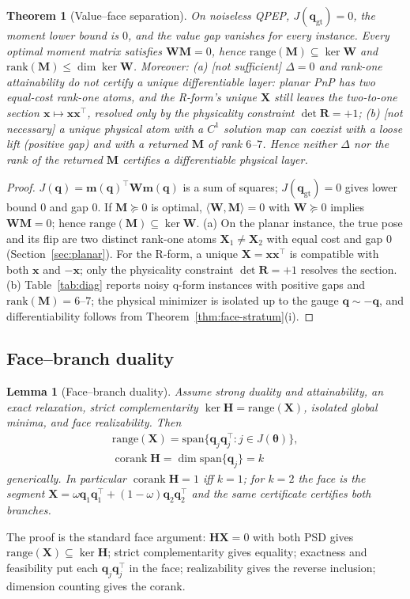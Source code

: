 \documentclass[conference]{IEEEtran}
\newtheorem{theorem}{Theorem}
\newtheorem{lemma}{Lemma}
\newcommand{\corank}{\operatorname{corank}}
\newcommand{\bx}{\bm{x}}
\newcommand{\bq}{\bm{q}}
\newcommand{\bth}{\bm{\theta}}
\newcommand{\bR}{\bm{R}}
\newcommand{\bH}{\bm{H}}
\newcommand{\bW}{\bm{W}}
\newcommand{\bX}{\bm{X}}
\newcommand{\bM}{\bm{M}}
\begin{document}
\begin{theorem}[Value--face separation]
\label{thm:value-face}
On noiseless QPEP, $J(\bq_{\mathrm{gt}})=0$, the moment lower bound is $0$, and the value gap vanishes for every instance. Every optimal moment matrix satisfies $\bW\bM=0$, hence $\mathrm{range}(\bM)\subseteq\ker\bW$ and $\mathrm{rank}(\bM)\le\dim\ker\bW$. Moreover:
(a) \emph{[not sufficient]} $\Delta=0$ and rank-one attainability do not certify a unique differentiable layer: planar PnP has two equal-cost rank-one atoms, and the R-form's unique $\bX$ still leaves the two-to-one section $\bx\mapsto\bx\bx^\top$, resolved only by the physicality constraint $\det\bR=+1$;
(b) \emph{[not necessary]} a unique physical atom with a $C^1$ solution map can coexist with a loose lift (positive gap) and with a returned $\bM$ of rank $6$--$7$.
Hence neither $\Delta$ nor the rank of the returned $\bM$ certifies a differentiable physical layer.
\end{theorem}
\begin{proof}
$J(\bq)=\bm{m}(\bq)^\top\bW\bm{m}(\bq)$ is a sum of squares; $J(\bq_{\mathrm{gt}})=0$ gives lower bound $0$ and gap $0$. If $\bM\succeq0$ is optimal, $\langle\bW,\bM\rangle=0$ with $\bW\succeq0$ implies $\bW\bM=0$; hence $\mathrm{range}(\bM)\subseteq\ker\bW$.
(a) On the planar instance, the true pose and its flip are two distinct rank-one atoms $\bX_1\ne\bX_2$ with equal cost and gap $0$ (Section~\ref{sec:planar}). For the R-form, a unique $\bX=\bx\bx^\top$ is compatible with both $\bx$ and $-\bx$; only the physicality constraint $\det\bR=+1$ resolves the section.
(b) Table~\ref{tab:diag} reports noisy q-form instances with positive gaps and $\mathrm{rank}(\bM)=6$--$7$; the physical minimizer is isolated up to the gauge $\bq\sim-\bq$, and differentiability follows from Theorem~\ref{thm:face-stratum}(i).
\end{proof}

\subsection{Face--branch duality}
\begin{lemma}[Face--branch duality]
\label{lem:face-branch}
Assume strong duality and attainability, an exact relaxation, strict complementarity $\ker\bH=\mathrm{range}(\bX)$, isolated global minima, and face realizability. Then
\begin{multline}
\mathrm{range}(\bX)=\mathrm{span}\{\bq_j\bq_j^\top: j\in J(\bth)\},\\
\corank\bH=\dim\mathrm{span}\{\bq_j\}=k
\label{eq:duality}
\end{multline}
generically. In particular $\corank\bH=1$ iff $k=1$; for $k=2$ the face is the segment $\bX=\omega\bq_1\bq_1^\top+(1-\omega)\bq_2\bq_2^\top$ and the same certificate certifies both branches.
\end{lemma}
The proof is the standard face argument: $\bH\bX=0$ with both PSD gives $\mathrm{range}(\bX)\subseteq\ker\bH$; strict complementarity gives equality; exactness and feasibility put each $\bq_j\bq_j^\top$ in the face; realizability gives the reverse inclusion; dimension counting gives the corank.
\end{document}
